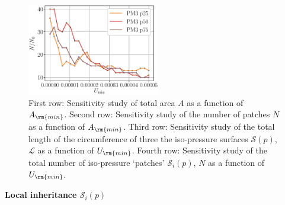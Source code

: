 \documentclass[draft,jgrga]{agutexSI2019}
\begin{document}
\begin{article}
\begin{figure}
\noindent\includegraphics[height=4cm]{figures/SI_figures/N_vs_Umin_PM3.eps}
\caption{First row: Sensitivity study of total area $A$ as a function of $A_{\rm{min}}$. Second row:  Sensitivity study of the number of patches $N$ as a function of $A_{\rm{min}}$. Third row:  Sensitivity study of the total length of the circumference of three the iso-pressure surfaces $\mathcal{S}(p)$, $\mathcal{L}$ as a function of $U_{\rm{min}}$. Fourth row: Sensitivity study of the total number of iso-pressure `patches' $\mathcal{S}_i(p)$, $N$ as a function of $U_{\rm{min}}$.}
\end{figure}





\noindent\textbf{Local inheritance $\mathcal{S}_i(p)$}


\end{article}
\end{document}
